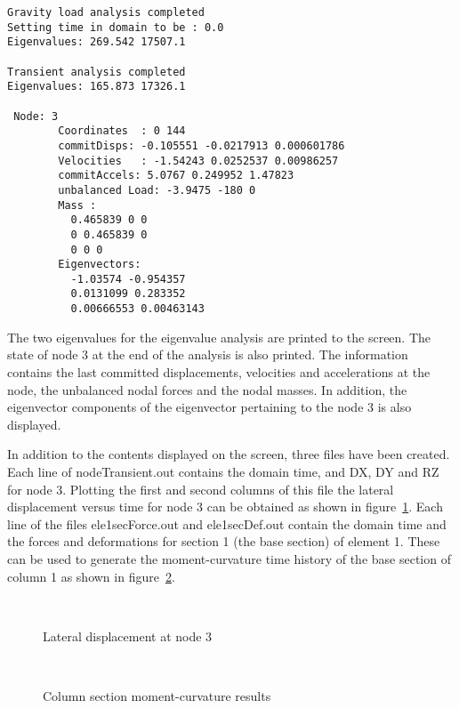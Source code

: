 \documentclass[12pt]{article}
\begin{document}
\pagebreak
{}
{\sf\small
\begin{verbatim}
Gravity load analysis completed
Setting time in domain to be : 0.0
Eigenvalues: 269.542 17507.1 

Transient analysis completed
Eigenvalues: 165.873 17326.1 

 Node: 3
        Coordinates  : 0 144 
        commitDisps: -0.105551 -0.0217913 0.000601786 
        Velocities   : -1.54243 0.0252537 0.00986257 
        commitAccels: 5.0767 0.249952 1.47823 
        unbalanced Load: -3.9475 -180 0 
        Mass : 
          0.465839 0 0 
          0 0.465839 0 
          0 0 0 
        Eigenvectors: 
          -1.03574 -0.954357 
          0.0131099 0.283352 
          0.00666553 0.00463143 
\end{verbatim}
}

The two eigenvalues for the eigenvalue analysis are printed to the
screen. The state of node 3 at the end of the analysis is also
printed. The information contains the last committed displacements,
velocities and accelerations at the node, the unbalanced nodal forces
and the nodal masses. In addition, the eigenvector components of the
eigenvector pertaining to the node 3 is also displayed.

In addition to the contents displayed on the screen, three files have been
created. Each line of nodeTransient.out contains the domain
time, and DX, DY and RZ for node 3. Plotting the first and second
columns of this file the lateral displacement versus time for node 3
can be obtained as shown in figure~\ref{lateral33}. Each line of the files
ele1secForce.out and ele1secDef.out contain the domain time and the
forces and deformations for section 1 (the base section) of element
1. These can be used to generate the moment-curvature time history of
the base section of column 1 as shown in figure~\ref{element1MK}.

\begin{figure}[htpb]
\begin{center}
\leavevmode
\hbox{%
\epsfxsize=4.0in
}
\end{center}
\caption{Lateral displacement at node 3}
\label{lateral33}
\end{figure}

\begin{figure}[htpb]
\begin{center}
\leavevmode
\hbox{%
\epsfxsize=4.0in
}
\end{center}
\caption{Column section moment-curvature results}
\label{element1MK}
\end{figure}
\end{document}
